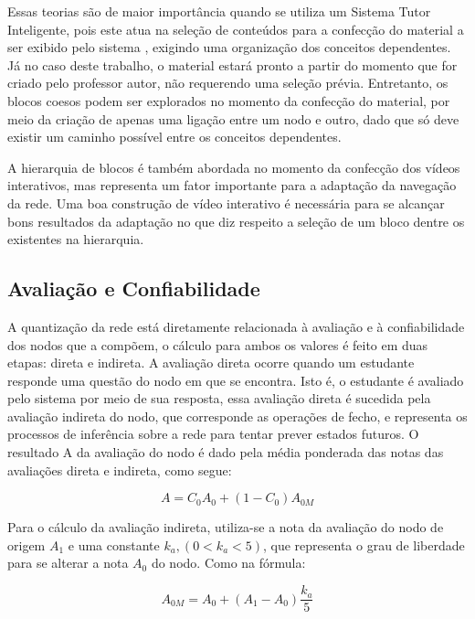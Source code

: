 Essas teorias são de maior importância quando se utiliza um Sistema Tutor Inteligente, pois este atua na seleção de conteúdos para a confecção do material a ser exibido pelo sistema \cite{fragelli2010}, exigindo uma organização dos conceitos dependentes. Já no caso deste trabalho, o material estará pronto a partir do momento que for criado pelo professor autor, não requerendo uma seleção prévia. Entretanto, os blocos coesos podem ser explorados no momento da confecção do material, por meio da criação de apenas uma ligação entre um nodo e outro, dado que só deve existir um caminho possível entre os conceitos dependentes.

A hierarquia de blocos é também abordada no momento da confecção dos vídeos interativos, mas representa um fator importante para a adaptação da navegação da rede. Uma boa construção de vídeo interativo é necessária para se alcançar bons resultados da adaptação no que diz respeito a seleção de um bloco dentre os existentes na hierarquia.

\subsection{Avaliação e Confiabilidade}

A quantização da rede está diretamente relacionada à avaliação e à confiabilidade dos nodos que a compõem, o cálculo para ambos os valores é feito em duas etapas: direta e indireta. A avaliação direta ocorre quando um estudante responde uma questão do nodo em que se encontra. Isto é, o estudante é avaliado pelo sistema por meio de sua resposta, essa avaliação direta é sucedida pela avaliação indireta do nodo, que corresponde as operações de fecho, e representa os processos de inferência sobre a rede para tentar prever estados futuros. O resultado A da avaliação do nodo é dado pela média ponderada das notas das avaliações direta e indireta, como segue:

\begin{equation}
	A = C_{0}A_{0} + (1 - C_{0})A_{0M}
\end{equation}

Para o cálculo da avaliação indireta, utiliza-se a nota da avaliação do nodo de origem \(A_{1}\) e uma constante \( k_{a},(0 < k_{a} < 5) \), que representa o grau de liberdade para se alterar a nota \(A_{0}\) do nodo. Como na fórmula:

\begin{equation}
	A_{0M} =  A_{0} + (A_{1} - A_{0})\frac{k_{a}}{5}
\end{equation}

